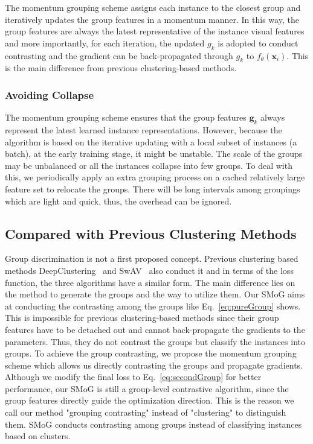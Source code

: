 \documentclass[runningheads]{style/llncs}
\begin{document}
The momentum grouping scheme assigns each instance to the closest group and iteratively updates the group features in a momentum manner. In this way, the group features are always the latest representative of the instance visual features and more importantly, for each iteration, the updated $g_k$ is adopted to conduct contrasting and the gradient can be back-propagated through $g_k$ to $f_\theta(\mathbf{x}_i)$. This is the main difference from previous clustering-based methods. 
\subsubsection{Avoiding Collapse}
The momentum grouping scheme ensures that the group features $\mathbf{g}_k$ always represent the latest learned instance representations. However, because the algorithm is based on the iterative updating with a local subset of instances (a batch), at the early training stage, it might be unstable. The scale of the groups may be unbalanced or all the instances collapse into few groups. To deal with this, we periodically apply an extra grouping process on a cached relatively large feature set to relocate the groups. There will be long intervals among groupings which are light and quick, thus, the overhead can be ignored.

\subsection{Compared with Previous Clustering Methods}
Group discrimination is not a first proposed concept. Previous clustering based methods DeepClustering~\cite{deepcluster} and SwAV~\cite{swav} also conduct it and in terms of the loss function, the three algorithms have a similar form. The main difference lies on the method to generate the groups and the way to utilize them. Our SMoG aims at conducting the contrasting among the groups like Eq.~\ref{eq:pureGroup} shows. This is impossible for previous clustering-based methods since their group features have to be detached out and cannot back-propagate the gradients to the parameters. Thus, they do not contrast the groups but classify the instances into groups. To achieve the group contrasting, we propose the momentum grouping scheme which allows us directly contrasting the groups and propagate gradients. Although we modify the final loss to Eq.~\ref{eq:secondGroup} for better performance, our SMoG is still a group-level contrastive algorithm, since the group features directly guide the optimization direction. This is the reason we call our method "grouping contrasting" instead of "clustering" to distinguish them. SMoG conducts contrasting among groups instead of classifying instances based on clusters.
\end{document}
